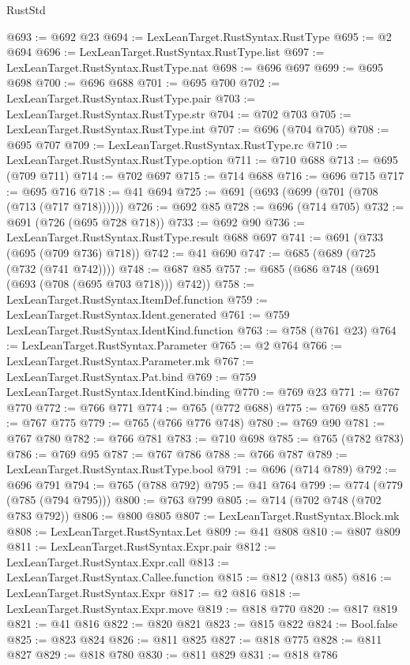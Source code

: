 \begin{lexlean}{RustStd}
\begin{coremodule}
@693 := @692 @23
@694 := LexLeanTarget.RustSyntax.RustType
@695 := @2 @694
@696 := LexLeanTarget.RustSyntax.RustType.list
@697 := LexLeanTarget.RustSyntax.RustType.nat
@698 := @696 @697
@699 := @695 @698
@700 := @696 @688
@701 := @695 @700
@702 := LexLeanTarget.RustSyntax.RustType.pair
@703 := LexLeanTarget.RustSyntax.RustType.str
@704 := @702 @703
@705 := LexLeanTarget.RustSyntax.RustType.int
@707 := @696 (@704 @705)
@708 := @695 @707
@709 := LexLeanTarget.RustSyntax.RustType.rc
@710 := LexLeanTarget.RustSyntax.RustType.option
@711 := @710 @688
@713 := @695 (@709 @711)
@714 := @702 @697
@715 := @714 @688
@716 := @696 @715
@717 := @695 @716
@718 := @41 @694
@725 := @691 (@693 (@699 (@701 (@708 (@713 (@717 @718))))))
@726 := @692 @85
@728 := @696 (@714 @705)
@732 := @691 (@726 (@695 @728 @718))
@733 := @692 @90
@736 := LexLeanTarget.RustSyntax.RustType.result @688 @697
@741 := @691 (@733 (@695 (@709 @736) @718))
@742 := @41 @690
@747 := @685 (@689 (@725 (@732 (@741 @742))))
@748 := @687 @85
@757 := @685 (@686 @748 (@691 (@693 (@708 (@695 @703 @718))) @742))
@758 := LexLeanTarget.RustSyntax.ItemDef.function
@759 := LexLeanTarget.RustSyntax.Ident.generated
@761 := @759 LexLeanTarget.RustSyntax.IdentKind.function
@763 := @758 (@761 @23)
@764 := LexLeanTarget.RustSyntax.Parameter
@765 := @2 @764
@766 := LexLeanTarget.RustSyntax.Parameter.mk
@767 := LexLeanTarget.RustSyntax.Pat.bind
@769 := @759 LexLeanTarget.RustSyntax.IdentKind.binding
@770 := @769 @23
@771 := @767 @770
@772 := @766 @771
@774 := @765 (@772 @688)
@775 := @769 @85
@776 := @767 @775
@779 := @765 (@766 @776 @748)
@780 := @769 @90
@781 := @767 @780
@782 := @766 @781
@783 := @710 @698
@785 := @765 (@782 @783)
@786 := @769 @95
@787 := @767 @786
@788 := @766 @787
@789 := LexLeanTarget.RustSyntax.RustType.bool
@791 := @696 (@714 @789)
@792 := @696 @791
@794 := @765 (@788 @792)
@795 := @41 @764
@799 := @774 (@779 (@785 (@794 @795)))
@800 := @763 @799
@805 := @714 (@702 @748 (@702 @783 @792))
@806 := @800 @805
@807 := LexLeanTarget.RustSyntax.Block.mk
@808 := LexLeanTarget.RustSyntax.Let
@809 := @41 @808
@810 := @807 @809
@811 := LexLeanTarget.RustSyntax.Expr.pair
@812 := LexLeanTarget.RustSyntax.Expr.call
@813 := LexLeanTarget.RustSyntax.Callee.function
@815 := @812 (@813 @85)
@816 := LexLeanTarget.RustSyntax.Expr
@817 := @2 @816
@818 := LexLeanTarget.RustSyntax.Expr.move
@819 := @818 @770
@820 := @817 @819
@821 := @41 @816
@822 := @820 @821
@823 := @815 @822
@824 := Bool.false
@825 := @823 @824
@826 := @811 @825
@827 := @818 @775
@828 := @811 @827
@829 := @818 @780
@830 := @811 @829
@831 := @818 @786

\end{coremodule}
\end{lexlean}
